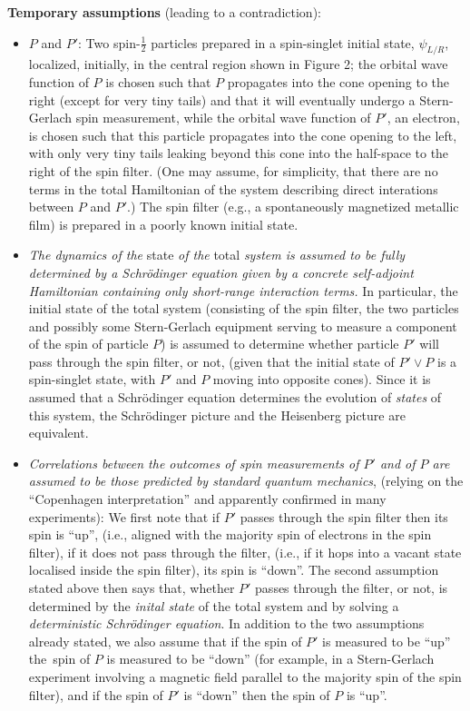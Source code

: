 \documentclass[12pt]{article}
\begin{document}
{\bf{Temporary assumptions}} (leading to a contradiction):
\begin{itemize} 
\item{$P$ and $P'$: Two spin-$\frac{1}{2}$ particles prepared in a {spin-singlet initial state}, $\psi_{L/R}$, localized, initially, in the central region shown in Figure 2; the orbital wave function of $P$ is chosen such that $P$ propagates into the cone opening to the right (except for very tiny tails) and that it will eventually undergo a Stern-Gerlach spin measurement, while the orbital wave function of $P'$, an electron, is chosen such that this particle propagates into the cone opening to the left, with only very tiny tails leaking beyond this cone into the half-space to the right of the spin filter. (One may assume, for simplicity, that there are no terms in the total Hamiltonian of the system describing direct interations between $P$ and $P'$.)
The spin filter (e.g., a spontaneously magnetized metallic film) is prepared in a {poorly known} initial state.}
\item{\textit{The dynamics of the} {state} \textit{of the} {total} \textit{system is assumed to be fully determined by a Schr\"{o}dinger equation given by a concrete self-adjoint Hamiltonian containing only short-range interaction terms.} In particular, the initial state of the total system (consisting of the spin filter, the two particles and possibly some Stern-Gerlach equipment serving to measure a component of the spin of particle $P$) is assumed to {determine} whether particle $P'$ will pass through the spin filter, or not, (given that the initial state of $P' \vee P$ is a spin-singlet state, with $P'$ and $P$ moving into {opposite} cones).} Since it is assumed that a Schr\"{o}dinger equation determines the evolution of \textit{states} of this system, the Schr\"{o}dinger picture and the Heisenberg picture are equivalent.
\item{\textit{Correlations between the outcomes of spin measurements of $P'$ and of $P$ are assumed to be those predicted by standard quantum mechanics}, (relying on the ``Copenhagen interpretation'' and apparently confirmed in many experiments): We first note that if $P'$ passes through the spin filter then its spin is ``up'', (i.e., aligned with the majority spin of electrons in the spin filter), if it does not pass through the filter, (i.e., if it hops into a vacant state localised inside the spin filter), its spin is ``down''. The second assumption stated above then says that, whether $P'$ passes through the filter, or not, is determined by the \textit{inital state} of the total system and by solving a \textit{deterministic Schr\"{o}dinger equation}. In addition to the two assumptions already stated, we also assume that {if the spin of $P'$ is measured to be ``up'' the \,spin of $P$ is measured to be ``down}'' (for example, in a Stern-Gerlach experiment involving a magnetic field parallel to the majority spin of the spin filter), and if the spin of $P'$ is ``down'' then the spin of $P$ is ``up''.}
\end{itemize}
\end{document}

